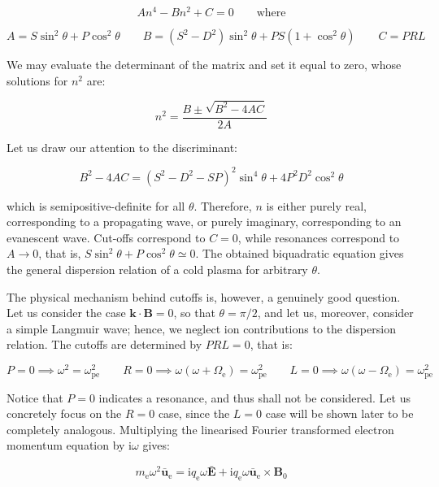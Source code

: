 \begin{equation}
    An^4-Bn^2+C=0\qquad\text{where}
\end{equation}

\begin{equation}
    A=S\sin^2{\theta}+P\cos^2{\theta}\qquad B=(S^2-D^2)\sin^2{\theta}+PS(1+\cos^2{\theta})\qquad C=PRL
\end{equation}

We may evaluate the determinant of the matrix and set it equal to zero, whose solutions for $n^2$ are:

\begin{equation}
    n^2=\frac{B\pm\sqrt{B^2-4AC}}{2A}
\end{equation}

Let us draw our attention to the discriminant:

\begin{equation}
    B^2-4AC=(S^2-D^2-SP)^2\sin^4{\theta}+4P^2D^2\cos^2{\theta}
\end{equation}

which is semipositive-definite for all $\theta$. Therefore, $n$ is either purely real, corresponding to a propagating wave, or purely imaginary, corresponding to an evanescent wave. Cut-offs correspond to $C=0$, while resonances correspond to $A\to0$, that is, $S\sin^2{\theta}+P\cos^2{\theta}\simeq0$. The obtained biquadratic equation gives the general dispersion relation of a cold plasma for arbitrary $\theta$.

\quad The physical mechanism behind cutoffs is, however, a genuinely good question. Let us consider the case $\mathbf{k}\cdot\mathbf{B}=0$, so that $\theta=\pi/2$, and let us, moreover, consider a simple Langmuir wave; hence, we neglect ion contributions to the dispersion relation. The cutoffs are determined by $PRL=0$, that is:

\begin{equation}
    P=0\implies\omega^2=\omega_\text{pe}^2\qquad R=0\implies\omega(\omega+\Omega_\text{e})=\omega_\text{pe}^2\qquad L=0\implies\omega(\omega-\Omega_\text{e})=\omega_\text{pe}^2
\end{equation}

Notice that $P=0$ indicates a resonance, and thus shall not be considered. Let us concretely focus on the $R=0$ case, since the $L=0$ case will be shown later to be completely analogous. Multiplying the linearised Fourier transformed electron momentum equation by $\mathrm{i}\omega$ gives:

\begin{equation}
    m_\text{e}\omega^2\bar{\mathbf{u}}_\text{e}=\mathrm{i}q_\text{e}\omega\bar{\mathbf{E}}+\mathrm{i}q_\text{e}\omega\bar{\mathbf{u}}_\text{e}\times\mathbf{B}_0
\end{equation}

